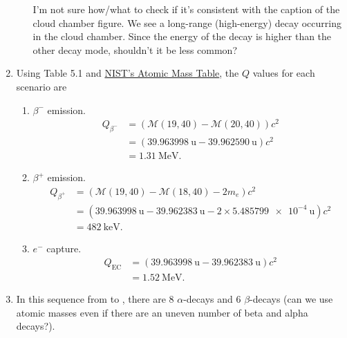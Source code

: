 \documentclass{homework}
\newcommand{\M}{\ensuremath{\mathcal{M}}}
\begin{document}
\begin{enumerate}
\begin{enumerate}
				I'm not sure how/what to check if it's consistent with the caption of the cloud chamber figure. We see a long-range (high-energy) decay occurring in the cloud chamber. Since the energy of the decay is higher than the other decay mode, shouldn't it be less common? 
		\end{enumerate}
	
		\item Using Table 5.1 and \href{https://physics.nist.gov/cgi-bin/Compositions/stand_alone.pl}{NIST's Atomic Mass Table}, the $Q$ values for each scenario are \begin{enumerate}
			\item $\beta^-$ emission. \begin{align*}
				Q_{\beta^-}& = \left(\M(19, 40) - \M(20, 40)\right)c^2 \\
					& = \left(\SI{39.963998}{\atomicmassunit} - \SI{39.962590}{\atomicmassunit} \right)c^2\\
					& = \SI{1.31}{\MeV}.
			\end{align*}
		
			\item $\beta^+$ emission. \begin{align*}
				Q_{\beta^+} & = \left(
					\M(19, 40) - \M(18, 40) - 2 m_e
				\right)c^2 \\
					& = \left(
						\SI{39.963998}{\atomicmassunit}
						- \SI{39.962383}{\atomicmassunit}
						- 2 \times \SI{5.485799e-4}{\atomicmassunit}
					\right)c^2 \\
					& = \SI{482}{\keV}.
			\end{align*}	
		
			\item $e^-$ capture.
				\begin{align*}
					Q_\mathrm{EC} & =  \left(
					\SI{39.963998}{\atomicmassunit}
					- \SI{39.962383}{\atomicmassunit}
					\right)c^2 \\
					& = \SI{1.52}{\MeV}.
				\end{align*}
		\end{enumerate}
	
		\item In this sequence from  to , there are 8 $\alpha$-decays and 6 $\beta$-decays (can we use atomic masses even if there are an uneven number of beta and alpha decays?). 
		

\end{enumerate}
\end{document}

